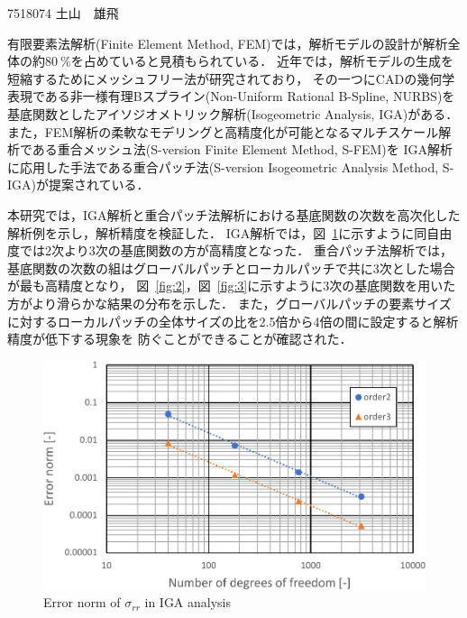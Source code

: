 \documentclass[12pt,a4j,fleqn]{jsarticle}
\begin{document}
\begin{center}
\textsf{}
\end{center}
\vspace{\baselineskip}
\begin{flushleft}
[岡田研究室]
\end{flushleft}
\vspace{-2\baselineskip}
\begin{flushright}
7518074 土山　雄飛
\end{flushright}

有限要素法解析(Finite Element Method, FEM)では，解析モデルの設計が解析全体の約$80\ \%$を占めていると見積もられている．
近年では，解析モデルの生成を短縮するためにメッシュフリー法が研究されており，
その一つにCADの幾何学表現である非一様有理Bスプライン(Non-Uniform Rational B-Spline, NURBS)を
基底関数としたアイソジオメトリック解析(Isogeometric Analysis, IGA)がある．
また，FEM解析の柔軟なモデリングと高精度化が可能となるマルチスケール解析である重合メッシュ法(S-version Finite Element Method, S-FEM)を
IGA解析に応用した手法である重合パッチ法(S-version Isogeometric Analysis Method, S-IGA)が提案されている．

本研究では，IGA解析と重合パッチ法解析における基底関数の次数を高次化した解析例を示し，解析精度を検証した．
IGA解析では，図~\ref{fig:1}に示すように同自由度では2次より3次の基底関数の方が高精度となった．
重合パッチ法解析では，基底関数の次数の組はグローバルパッチとローカルパッチで共に3次とした場合が最も高精度となり，
図~\ref{fig:2}，図~\ref{fig:3}に示すように3次の基底関数を用いた方がより滑らかな結果の分布を示した．
また，グローバルパッチの要素サイズに対するローカルパッチの全体サイズの比を2.5倍から4倍の間に設定すると解析精度が低下する現象を
防ぐことができることが確認された．

\begin{figure}[htbp]
  \centering
  \includegraphics[keepaspectratio, scale = 0.415]
  {fig/ER01-crop.pdf}
  \caption{Error norm of $\sigma_{rr}$ in IGA analysis}
  \label{fig:1}
\end{figure}
\end{document}
